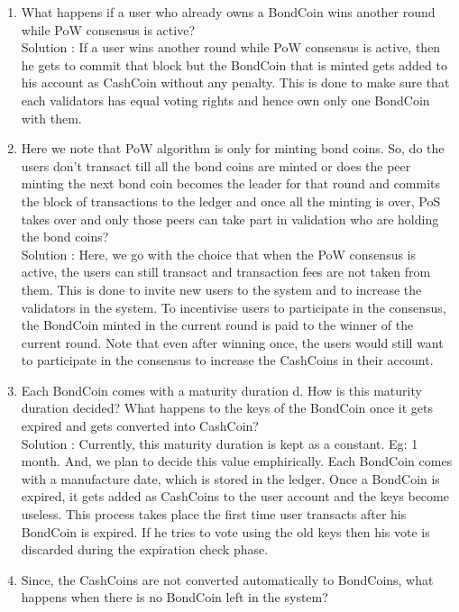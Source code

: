 \begin{enumerate}
    \item What happens if a user who already owns a BondCoin wins another round while PoW consensus is active?\\
    Solution : If a user wins another round while PoW consensus is active, then he gets to commit that block but the BondCoin that is minted gets added to his account as CashCoin without any penalty. This is done to make sure that each validators has equal voting rights and hence own only one BondCoin with them.
    \item Here we note that PoW algorithm is only for minting bond coins. So, do the users don’t transact till all the bond coins are minted or does the peer minting the next bond coin becomes the leader for that round and commits the block of transactions to the ledger and once all the minting is over, PoS takes over and only those peers can take part in validation who are holding the bond coins?\\
    Solution : Here, we go with the choice that when the PoW consensus is active, the users can still transact and transaction fees are not taken from them. This is done to invite new users to the system and to increase the validators in the system. To incentivise users to participate in the consensus, the BondCoin minted in the current round is paid to the winner of the current round. Note that even after winning once, the users would still want to participate in the consensus to increase the CashCoins in their account.
    \item Each BondCoin comes with a maturity duration d. How is this maturity duration decided? What happens to the keys of the BondCoin once it gets expired and gets converted into CashCoin?\\
    Solution : Currently, this maturity duration is kept as a constant. Eg: 1 month. And, we plan to decide this value emphirically. Each BondCoin comes with a manufacture date, which is stored in the ledger. Once a BondCoin is expired, it gets added as CashCoins to the user account and the keys become useless. This process takes place the first time user transacts after his BondCoin is expired. If he tries to vote using the old keys then his vote is discarded during the expiration check phase.
    \item Since, the CashCoins are not converted automatically to BondCoins, what happens when there is no BondCoin left in the system?\\

\end{enumerate}
